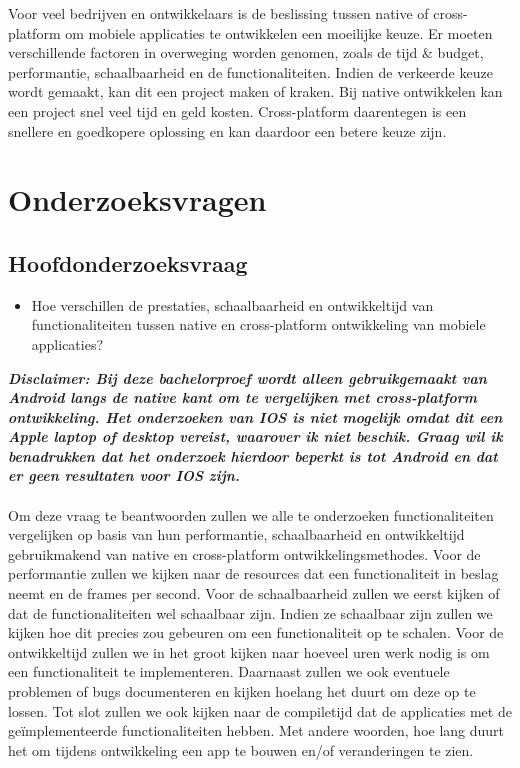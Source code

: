 Voor veel bedrijven en ontwikkelaars is de beslissing tussen native of cross-platform om mobiele applicaties te ontwikkelen een moeilijke keuze. 
Er moeten verschillende factoren in overweging worden genomen, zoals de tijd \& budget, performantie, schaalbaarheid en de functionaliteiten. 
Indien de verkeerde keuze wordt gemaakt, kan dit een project maken of kraken. Bij native ontwikkelen kan een project snel veel tijd en geld kosten. 
Cross-platform daarentegen is een snellere en goedkopere oplossing en kan daardoor een betere keuze zijn.

\section{Onderzoeksvragen}%
\label{sec:onderzoeksvraag}

\subsection{Hoofdonderzoeksvraag}
\begin{itemize}
    \item Hoe verschillen de prestaties, schaalbaarheid en ontwikkeltijd van functionaliteiten tussen native en cross-platform ontwikkeling van mobiele applicaties?
\end{itemize}

\label{disclaimer:ios}
\textbf{\textit{Disclaimer: Bij deze bachelorproef wordt alleen gebruikgemaakt van Android langs de native kant om te vergelijken met cross-platform ontwikkeling. 
Het onderzoeken van IOS is niet mogelijk omdat dit een Apple laptop of desktop vereist, waarover ik niet beschik. 
Graag wil ik benadrukken dat het onderzoek hierdoor beperkt is tot Android en dat er geen resultaten voor IOS zijn.}}
\\\\
Om deze vraag te beantwoorden zullen we alle te onderzoeken functionaliteiten vergelijken op basis van hun performantie, 
schaalbaarheid en ontwikkeltijd gebruikmakend van native en cross-platform ontwikkelingsmethodes. 
Voor de performantie zullen we kijken naar de resources dat een functionaliteit in beslag neemt en de frames per second. 
Voor de schaalbaarheid zullen we eerst kijken of dat de functionaliteiten wel schaalbaar zijn. 
Indien ze schaalbaar zijn zullen we kijken hoe dit precies zou gebeuren om een functionaliteit op te schalen. 
Voor de ontwikkeltijd zullen we in het groot kijken naar hoeveel uren werk nodig is om een functionaliteit te implementeren. 
Daarnaast zullen we ook eventuele problemen of bugs documenteren en kijken hoelang het duurt om deze op te lossen. 
Tot slot zullen we ook kijken naar de compiletijd dat de applicaties met de geïmplementeerde functionaliteiten hebben. 
Met andere woorden, hoe lang duurt het om tijdens ontwikkeling een app te bouwen en/of veranderingen te zien.

